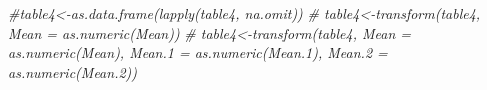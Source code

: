 \documentclass[]{article}
\newenvironment{Shaded}{\begin{snugshade}}{\end{snugshade}}
\newcommand{\KeywordTok}[1]{\textcolor[rgb]{0.13,0.29,0.53}{\textbf{#1}}}
\newcommand{\DataTypeTok}[1]{\textcolor[rgb]{0.13,0.29,0.53}{#1}}
\newcommand{\DecValTok}[1]{\textcolor[rgb]{0.00,0.00,0.81}{#1}}
\newcommand{\StringTok}[1]{\textcolor[rgb]{0.31,0.60,0.02}{#1}}
\newcommand{\CommentTok}[1]{\textcolor[rgb]{0.56,0.35,0.01}{\textit{#1}}}
\newcommand{\NormalTok}[1]{#1}
\begin{document}
\begin{Shaded}
\begin{Highlighting}[]
\CommentTok{#table4<-as.data.frame(lapply(table4, na.omit))}
\CommentTok{# table4<-transform(table4, Mean = as.numeric(Mean))}
\CommentTok{# table4<-transform(table4, Mean = as.numeric(Mean), Mean.1 = as.numeric(Mean.1), Mean.2 = as.numeric(Mean.2))}
\end{Highlighting}
\end{Shaded}

\begin{Shaded}
\end{Shaded}
\end{document}
